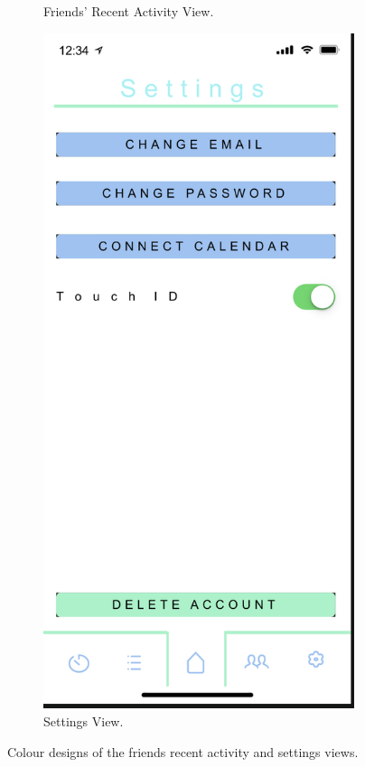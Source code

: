 \begin{figure}[H]
\begin{subfigure}[b]{0.3\textwidth}
        \caption{Friends' Recent Activity View.}
        \label{fig:friends_recent_colour}
    \end{subfigure}
    \hfill
    \begin{subfigure}[b]{0.3\textwidth}
        \centering
        \includegraphics[width=\textwidth]{./graphics/design/Settings Colour.png}
        \caption{Settings View.}
        \label{fig:settings_colour}
    \end{subfigure}
    
    \caption{Colour designs of the friends recent activity and settings views.}
    \label{fig:friendsrecent_settings_colour}
\end{figure}
